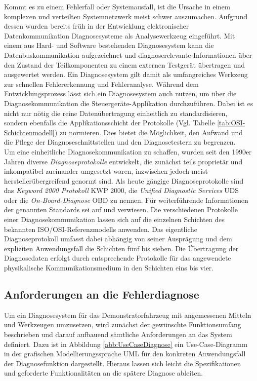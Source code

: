 Kommt es zu einem Fehlerfall oder Systemausfall, ist die Ursache in einem komplexen und verteilten Systemnetzwerk meist schwer auszumachen. Aufgrund dessen wurden bereits früh in der Entwicklung elektronischer Datenkommunikation Diagnosesysteme als Analysewerkzeug eingeführt. Mit einem aus Hard- und Software bestehenden Diagnosesystem kann die Datenbuskommunikation aufgezeichnet und diagnoserelevante Informationen über den Zustand der Teilkomponenten zu einem externen Testgerät übertragen und ausgewertet werden. Ein Diagnosesystem gilt damit als umfangreiches Werkzeug zur schnellen Fehlererkennung und Fehleranalyse. Während dem Entwicklungsprozess lässt sich ein Diagnosesystem auch nutzen, um über die Diagnosekommunikation die Steuergeräte-Applikation durchzuführen. Dabei ist es nicht nur nötig die reine Datenübertragung einheitlich zu standardisieren, sondern ebenfalls die Applikationsschicht der Protokolle (Vgl. Tabelle \ref{tab:OSI-Schichtenmodell}) zu normieren. Dies bietet die Möglichkeit, den Aufwand und die Pflege der Diagnoseschnittstellen und den Diagnosetestern zu begrenzen. \\
Um eine einheitliche Diagnosekommunikation zu schaffen, wurden seit den 1990er Jahren diverse \emph{Diagnoseprotokolle} entwickelt, die zunächst teils proprietär und inkompatibel zueinander umgesetzt waren, inzwischen jedoch meist herstellerübergreifend genormt sind. Als heute gängige Diagnoseprotokolle sind das \emph{Keyword 2000 Protokoll} \acs{KWP} 2000, die \emph{Unified Diagnostic Services} \acs{UDS} oder die \emph{On-Board-Diagnose} \acs{OBD} zu nennen. Für weiterführende Informationen der genannten Standards sei auf \cite{Zimmermann.2014} und \cite{Schaffer.2012} verwiesen. Die verschiedenen Protokolle einer Diagnosekommunikation lassen sich auf die einzelnen Schichten des bekannten ISO/OSI-Referenzmodells anwenden. Das eigentliche Diagnoseprotokoll umfasst dabei abhängig von seiner Ausprägung und dem expliziten Anwendungsfall die Schichten fünf bis sieben. Die Übertragung der Diagnosedaten erfolgt durch entsprechende Protokolle für das angewendete physikalische Kommunikationsmedium in den Schichten eins bis vier. 


\subsection{Anforderungen an die Fehlerdiagnose}
\label{subsec:AnforderungenDiagnose}

Um ein Diagnosesystem für das Demonstratorfahrzeug mit angemessenen Mitteln und Werkzeugen umzusetzen, wird zunächst der gewünschte Funktionsumfang beschrieben und darauf aufbauend sämtliche Anforderungen an das System definiert.
Dazu ist in Abbildung \ref{abb:UseCaseDiagnose} ein Use-Case-Diagramm in der grafischen Modellierungssprache \acs{UML} für den konkreten Anwendungsfall der Diagnosefunktion dargestellt. Hieraus lassen sich leicht die Spezifikationen und geforderte Funktionalitäten an die spätere Diagnose ableiten.

